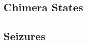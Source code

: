 \subsection{Chimera States}
\label{sec:intro_chimera}


\subsection{Seizures}
\label{sec:intro_seizures}


